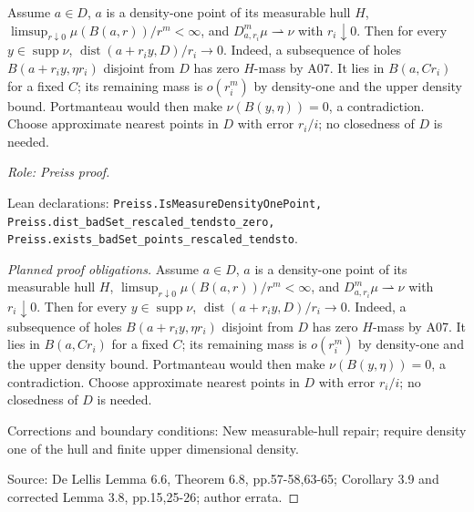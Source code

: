 \begin{lemma}
\label{lem:hull-support-approximation}






Assume $a\in D$, $a$ is a density-one point of its measurable hull $H$,
$\limsup_{r\downarrow0}\mu(B(a,r))/r^m<\infty$, and
$D^m_{a,r_i}\mu\rightharpoonup\nu$ with $r_i\downarrow0$.
Then for every $y\in\operatorname{supp}\nu$,
$\operatorname{dist}(a+r_i y,D)/r_i\to0$.
Indeed, a subsequence of holes $B(a+r_i y,\eta r_i)$ disjoint from $D$ has
zero $H$-mass by A07. It lies in $B(a,Cr_i)$ for a fixed $C$; its remaining
mass is $o(r_i^m)$ by density-one and the upper density bound. Portmanteau
would then make $\nu(B(y,\eta))=0$, a contradiction. Choose approximate
nearest points in $D$ with error $r_i/i$; no closedness of $D$ is needed.
\par\emph{Role: Preiss proof.}
\par Lean declarations: \texttt{Preiss.IsMeasureDensityOnePoint, Preiss.dist\_badSet\_rescaled\_tendsto\_zero, Preiss.exists\_badSet\_points\_rescaled\_tendsto}.
\end{lemma}
\begin{proof}[Planned proof obligations]

Assume $a\in D$, $a$ is a density-one point of its measurable hull $H$,
$\limsup_{r\downarrow0}\mu(B(a,r))/r^m<\infty$, and
$D^m_{a,r_i}\mu\rightharpoonup\nu$ with $r_i\downarrow0$.
Then for every $y\in\operatorname{supp}\nu$,
$\operatorname{dist}(a+r_i y,D)/r_i\to0$.
Indeed, a subsequence of holes $B(a+r_i y,\eta r_i)$ disjoint from $D$ has
zero $H$-mass by A07. It lies in $B(a,Cr_i)$ for a fixed $C$; its remaining
mass is $o(r_i^m)$ by density-one and the upper density bound. Portmanteau
would then make $\nu(B(y,\eta))=0$, a contradiction. Choose approximate
nearest points in $D$ with error $r_i/i$; no closedness of $D$ is needed.
\par Corrections and boundary conditions: New measurable-hull repair; require density one of the hull and finite upper dimensional density.
\par Source: De Lellis Lemma 6.6, Theorem 6.8, pp.57-58,63-65; Corollary 3.9 and corrected Lemma 3.8, pp.15,25-26; author errata.
\end{proof}

